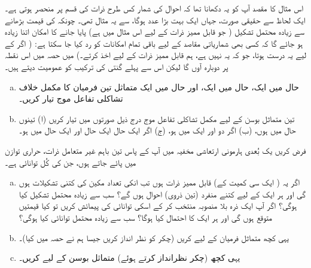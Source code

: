 اس مثال کا مقصد آپ کو یہ دکھانا تھا کہ احوال کی شمار کس طرح ذرات کی قسم پر منحصر ہوتی ہے۔ ایک لحاظ سے حقیقی صورت، جہاں  ایک بہت بڑا عدد ہوگا، سے یہ مثال  تھی۔ چونکہ  کی قیمت بڑھانے سے زیادہ محتمل تشکیل ( جو قابل ممیز ذرات کے لیے اس مثال میں  ہے) پایا جانے کا امکان اتنا زیادہ ہو جائے گا کہ کسی بھی شماریاتی مقاصد کے لیے باقی تمام امکانات کو رد کیا جا سکتا ہے: ( اگر  کے لیے یہ درست ہوتا، جو کہ یہ نہیں ہے، ہم قابل ممیز ذرات کے لیے  اخذ کرتے۔) میں حصہ  میں اس نقطہ پر دوبارہ آوں گا لیکن اس سے پہلے گنتی کی ترکیب کو عمومیت دیتے ہیں۔



\begin{enumerate}[a.]
\item
حال  میں ایک، حال  میں ایک، اور حال  میں ایک متماثل تین فرمیان کا مکمل خلاف تشاکلی تفاعل موج  تیار کریں۔
\item
 تین متماثل بوسن کے لیے مکمل تشاکلی تفاعل موج درج ذیل صورتوں میں تیار کریں (ا) تینوں حال  میں ہوں، (ب) اگر دو  اور ایک  میں ہو، (ج) اگر ایک حال  ایک حال  اور ایک حال  میں ہو۔ 
\end{enumerate}
فرض کریں یک بُعدی ہارمونی ارتعاشی مخفیہ میں آپ کے پاس تین باہم غیر متعامل ذرات، حراری توازن میں پائے جاتے ہوں، جن کی کُل توانائی ہے۔
\begin{enumerate}[a.]
\item
 اگر یہ ( ایک سی کمیت کے) قابل ممیز ذرات ہوں تب انکی تعداد مکین کی کتنی تشکیلات ہوں گی اور ہر ایک کے لیے کتنے منفرد (تین ذروی) احوال ہوں گے؟ سب سے زیادہ محتمل تشکیل کیا ہوگی؟ اگر آپ ایک ذرہ بلا منصوبہ منتخب کر کے اسکی توانائی کی پیمائش کریں تو کیا قیمتیں متوقع ہوں گی اور ہر ایک کا احتمال کیا ہوگا؟ سب سے زیادہ محتمل توانائی کیا ہوگی؟
\item
 یہی کچھ متماثل فرمیان کے لیے کریں (چکر کو نظر انداز کریں جیسا ہم نے حصہ  میں کیا)۔
\item
 یہی کچھ (چکر نظرانداز کرتے ہوئے) متماثل بوسن کے لیے کریں۔ 
 \end{enumerate}

